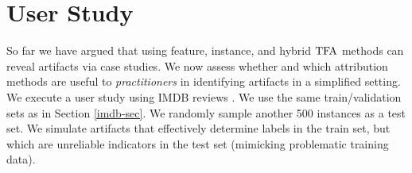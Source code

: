 \documentclass[11pt]{article}
\begin{document}
\section{User Study}
\label{section:user-study} 
So far we have argued that using feature, instance, and hybrid $\text{TFA}$ methods can reveal artifacts via case studies.
We now assess whether and which attribution methods are useful to \emph{practitioners} in identifying artifacts in a simplified setting. %
% 
We execute a user study using IMDB reviews \citep{maas2011learning}.
We use the same train/validation sets as in Section \ref{imdb-sec}. 
We randomly sample another 500 instances as a test set. 
We %
simulate artifacts that effectively determine labels in the train set, but which are unreliable indicators in the test set (mimicking problematic training data).
\end{document}
